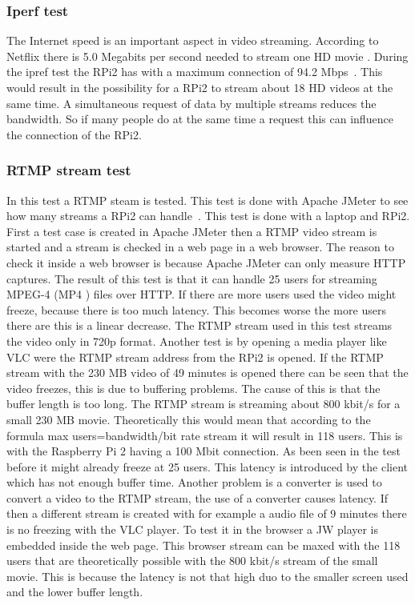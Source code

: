 \documentclass{sig-alternate-br}
\begin{document}
\subsubsection{Iperf test}

The Internet speed is an important aspect in video streaming. According to Netflix there is 5.0 Megabits per second needed to stream one HD movie \cite{netflix}. During the ipref test the RPi2 has with a maximum connection of  94.2 Mbps~\cite{ipref}. This would result in the possibility for a RPi2 to stream about 18 HD videos at the same time. A simultaneous request of data by multiple streams reduces the bandwidth. So if many people do at the same time a request this can influence the connection of the RPi2. 

\subsubsection{RTMP stream test}

In this test a RTMP steam is tested. This test is done with Apache JMeter to see how many streams a RPi2 can handle~\cite{jmeter}. This test is done with a laptop and RPi2. First a test case is created in Apache JMeter then a RTMP video stream is started and a stream is checked in a web page in a web browser. The reason to check it inside a web browser is because Apache JMeter can only measure HTTP captures. The result of this test is that it can handle 25 users for streaming MPEG-4 (MP4 ) files over HTTP. If there are more users used the video might freeze, because there is too much latency. This becomes worse the more users there are this is a linear decrease. The RTMP stream used in this test streams the video only in 720p format. \newline Another test is by opening a media player like VLC were the RTMP stream address from the RPi2 is opened. If the RTMP stream with the 230 MB video of 49 minutes is opened  there can be seen that the video freezes, this is due to buffering problems. The cause of this is that the buffer length is too long.  \newline
The RTMP stream is streaming about 800 kbit/s for a small 230 MB movie. Theoretically this would mean that according to the formula max users=bandwidth/bit rate stream it will result in 118 users. This is with the Raspberry Pi 2 having a 100 Mbit connection. As been seen in the test before it might already freeze at 25 users. This latency is introduced by the client which has not enough buffer time. Another problem is a converter is used to convert a video to the RTMP stream, the use of a converter causes latency. \newline
If then a different stream is created with for example a audio file of 9 minutes there is no freezing with the VLC player. \newline To test it in the browser a JW player is embedded inside the web page. This browser stream can be maxed with the 118 users that are theoretically possible with the 800 kbit/s stream of the small movie. This is because the latency is not that high duo to the smaller screen used and the lower buffer length.
 
\end{document}
